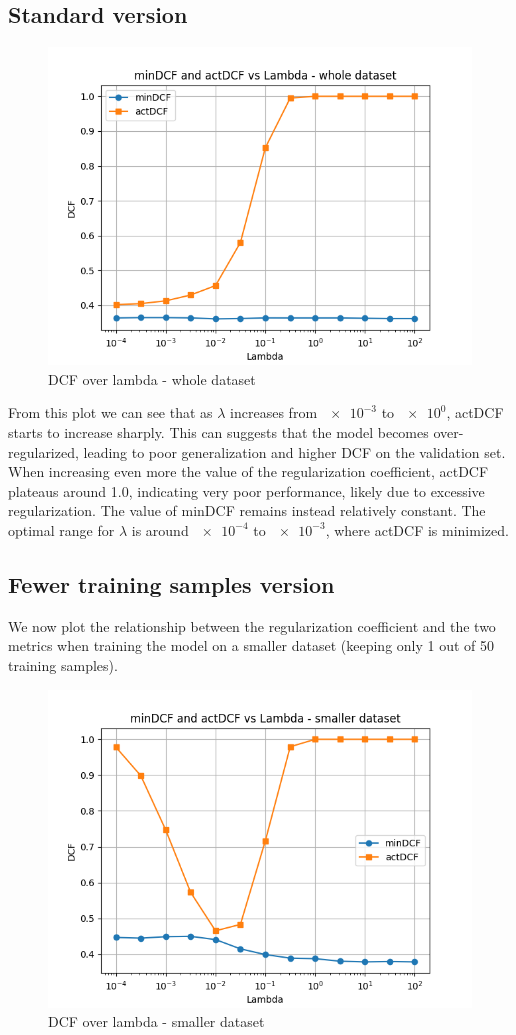 \documentclass[12pt, a4paper]{article}
\begin{document}
\subsection{Standard version}

\begin{figure}[ht]
	\centering
	\includegraphics[width=.4\textwidth]{project08/dcf_lambda_whole}
	\caption{DCF over lambda - whole dataset}
	\label{fig:LR_whole}
\end{figure}

From this plot we can see that as $\lambda$ increases from $\num{e-3}$ to $\num{e0}$, actDCF starts to increase sharply. This can suggests that the model becomes over-regularized, leading to poor generalization and higher DCF on the validation set. When increasing even more the value of the regularization coefficient, actDCF plateaus around 1.0, indicating very poor performance, likely due to excessive regularization. The value of minDCF remains instead relatively constant. The optimal range for $\lambda$ is around $\num{e-4}$ to $\num{e-3}$, where actDCF is minimized.

\subsection{Fewer training samples version}
We now plot the relationship between the regularization coefficient and the two metrics when training the model on a smaller dataset (keeping only 1 out of 50 training samples).

\begin{figure}[ht]
	\centering
	\includegraphics[width=.4\textwidth]{project08/dcf_lambda_smaller}
	\caption{DCF over lambda - smaller dataset}
	\label{fig:LR_smaller}
\end{figure}
\end{document}
